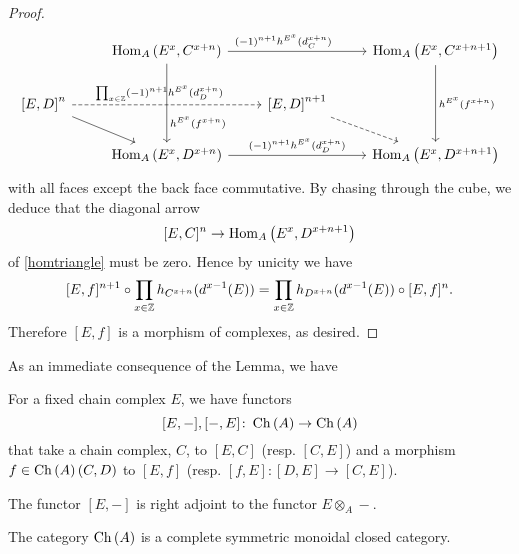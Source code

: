 \documentclass[dissertation.tex]{subfiles}
\begin{document}
\begin{lem}
\begin{proof}
$$\begin{tikzcd}
      & \Hom{A}{E^x,C^{x+n}} \arrow[pos=0.4]{rr}{(-1)^{n+1}h^{E^x}(d^{x+n}_C)}\arrow[pos=0.75]{dd}{h^{E^x}(f^{x+n})} & & \Hom{A}{E^x,C^{x+n+1}} \arrow{dd}{h^{E^x}(f^{x+n})}\\
      \left[E,D\right]^n \arrow{rd}\arrow[pos=0.46,dashed]{rr}{\prod_{x \in \Z} (-1)^{n+1}h^{E^x}(d^{x+n}_D)} & & \left[E,D\right]^{n+1}\arrow[dashed]{rd}\\
      & \Hom{A}{E^x,D^{x+n}} \arrow{rr}{(-1)^{n+1}h^{E^x}(d^{x+n}_D)} & & \Hom{A}{E^x,D^{x+n+1}}
    \end{tikzcd}$$
    with all faces except the back face commutative.
    By chasing through the cube, we deduce that the diagonal arrow
    $$[E,C]^n \to \operatorname{Hom}_{A}\left(E^x,D^{x+n+1}\right)$$
    of \ref{homtriangle} must be zero.
    Hence by unicity we have
    $$[E,f]^{n+1} \circ \prod_{x \in \mathbb{Z}} h_{C^{x+n}}(d^{x-1}(E)) = \prod_{x \in \mathbb{Z}} h_{D^{x+n}}(d^{x-1}(E)) \circ [E,f]^n.$$
    Therefore $[E,f]$ is a morphism of complexes, as desired.
  \end{proof}
\end{lem}

As an immediate consequence of the Lemma, we have

\begin{cor}
  For a fixed chain complex $E$, we have functors
  $$[E,-], [-,E] \colon \operatorname{Ch}\left(A\right) \to \operatorname{Ch}\left(A\right)$$
  that take a chain complex, $C$, to $[E,C]$ (resp. $[C,E]$) and a morphism $f \in \operatorname{Ch}\left(A\right)(C,D)$ to $[E,f]$ (resp. $[f,E] \colon [D,E] \to [C,E]$).
\end{cor}

\begin{prop}\label{ChHomTensorAdjunction}
  The functor $[E,-]$ is right adjoint to the functor $E \otimes_A -$.
\end{prop}

\begin{cor}
  The category $\operatorname{Ch}\left(A\right)$ is a complete symmetric monoidal closed category.
\end{cor}
\end{document}
